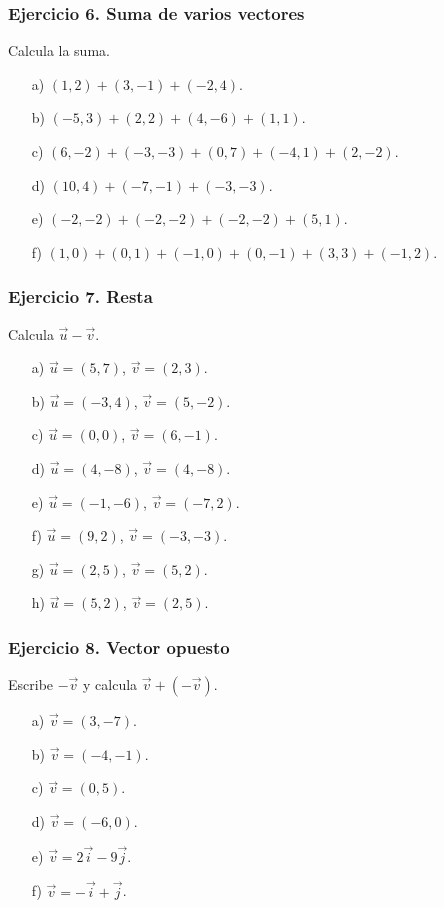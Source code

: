 \subsubsection*{Ejercicio 6. Suma de varios vectores}

Calcula la suma.

\begin{enumerate}
    \item[a)] $(1,2)+(3,-1)+(-2,4)$.
    \item[b)] $(-5,3)+(2,2)+(4,-6)+(1,1)$.
    \item[c)] $(6,-2)+(-3,-3)+(0,7)+(-4,1)+(2,-2)$.
    \item[d)] $(10,4)+(-7,-1)+(-3,-3)$.
    \item[e)] $(-2,-2)+(-2,-2)+(-2,-2)+(5,1)$.
    \item[f)] $(1,0)+(0,1)+(-1,0)+(0,-1)+(3,3)+(-1,2)$.
\end{enumerate}

\subsubsection*{Ejercicio 7. Resta}

Calcula $\vec{u}-\vec{v}$.

\begin{enumerate}
    \item[a)] $\vec{u}=(5,7)$, $\vec{v}=(2,3)$.
    \item[b)] $\vec{u}=(-3,4)$, $\vec{v}=(5,-2)$.
    \item[c)] $\vec{u}=(0,0)$, $\vec{v}=(6,-1)$.
    \item[d)] $\vec{u}=(4,-8)$, $\vec{v}=(4,-8)$.
    \item[e)] $\vec{u}=(-1,-6)$, $\vec{v}=(-7,2)$.
    \item[f)] $\vec{u}=(9,2)$, $\vec{v}=(-3,-3)$.
    \item[g)] $\vec{u}=(2,5)$, $\vec{v}=(5,2)$.
    \item[h)] $\vec{u}=(5,2)$, $\vec{v}=(2,5)$.
\end{enumerate}

\subsubsection*{Ejercicio 8. Vector opuesto}

Escribe $-\vec{v}$ y calcula $\vec{v}+(-\vec{v})$.

\begin{enumerate}
    \item[a)] $\vec{v}=(3,-7)$.
    \item[b)] $\vec{v}=(-4,-1)$.
    \item[c)] $\vec{v}=(0,5)$.
    \item[d)] $\vec{v}=(-6,0)$.
    \item[e)] $\vec{v}=2\vec{i}-9\vec{j}$.
    \item[f)] $\vec{v}=-\vec{i}+\vec{j}$.
\end{enumerate}

